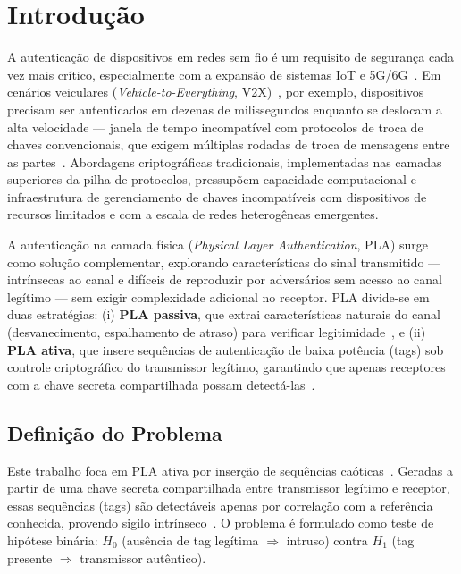 \documentclass[12pt,a4paper]{article}
\begin{document}
\newpage
\tableofcontents
\newpage

\section{Introdução}

A autenticação de dispositivos em redes sem fio é um requisito de segurança cada vez mais crítico, especialmente com a expansão de sistemas IoT e 5G/6G~\cite{ref_xie}. Em cenários veiculares (\textit{Vehicle-to-Everything}, V2X)~\cite{ref_3gpp}, por exemplo, dispositivos precisam ser autenticados em dezenas de milissegundos enquanto se deslocam a alta velocidade — janela de tempo incompatível com protocolos de troca de chaves convencionais, que exigem múltiplas rodadas de troca de mensagens entre as partes~\cite{ref_raya}. Abordagens criptográficas tradicionais, implementadas nas camadas superiores da pilha de protocolos, pressupõem capacidade computacional e infraestrutura de gerenciamento de chaves incompatíveis com dispositivos de recursos limitados e com a escala de redes heterogêneas emergentes.

A autenticação na camada física (\textit{Physical Layer Authentication}, PLA) surge como solução complementar, explorando características do sinal transmitido — intrínsecas ao canal e difíceis de reproduzir por adversários sem acesso ao canal legítimo — sem exigir complexidade adicional no receptor. PLA divide-se em duas estratégias: (i) \textbf{PLA passiva}, que extrai características naturais do canal (desvanecimento, espalhamento de atraso) para verificar legitimidade~\cite{ref_poor}, e (ii) \textbf{PLA ativa}, que insere sequências de autenticação de baixa potência (tags) sob controle criptográfico do transmissor legítimo, garantindo que apenas receptores com a chave secreta compartilhada possam detectá-las~\cite{ref_joao}.

 \subsection{Definição do Problema}

Este trabalho foca em PLA ativa por inserção de sequências caóticas~\cite{ref_yu}. Geradas a partir de uma chave secreta compartilhada entre transmissor legítimo e receptor, essas sequências (tags) são detectáveis apenas por correlação com a referência conhecida, provendo sigilo intrínseco~\cite{ref_joao}. O problema é formulado como teste de hipótese binária: $H_0$ (ausência de tag legítima $\Rightarrow$ intruso) contra $H_1$ (tag presente $\Rightarrow$ transmissor autêntico).
\end{document}
